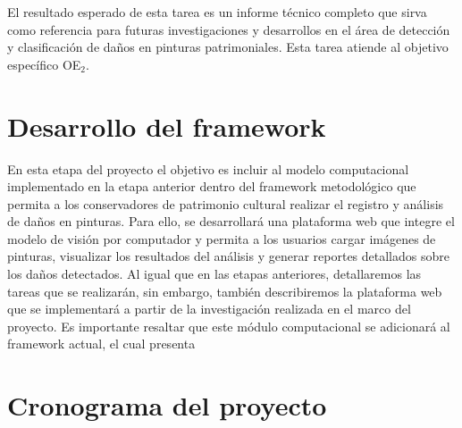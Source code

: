 El resultado esperado de esta tarea es un informe técnico completo que sirva como referencia para futuras investigaciones 
y desarrollos en el área de detección y clasificación de daños en pinturas patrimoniales. 
Esta tarea atiende al objetivo específico OE$_2$. 

\section{Desarrollo del framework}
En esta etapa del proyecto el objetivo es incluir al modelo computacional implementado en la etapa anterior dentro del 
framework metodológico que permita a los conservadores de patrimonio cultural realizar el registro y análisis de daños en pinturas.
Para ello, se desarrollará una plataforma web que integre el modelo de visión por computador y permita a los usuarios cargar 
imágenes de pinturas, visualizar los resultados del análisis y generar reportes detallados sobre los daños detectados.
Al igual que en las etapas anteriores, detallaremos las tareas que se realizarán, sin embargo,
también describiremos la plataforma web que se implementará a partir de la investigación realizada en el marco del proyecto.
Es importante resaltar que este módulo computacional se adicionará al framework actual, el cual presenta  

    
\section{Cronograma del proyecto}\label{sec:cronograma}


